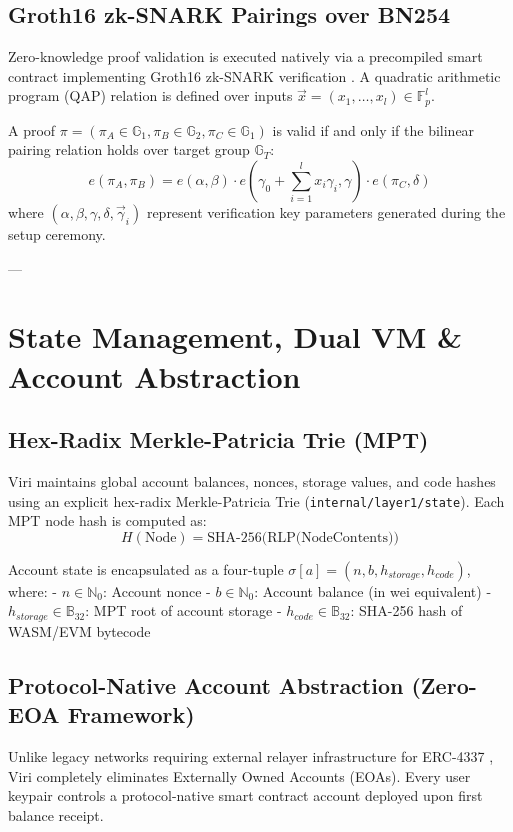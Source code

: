 \documentclass[10pt,journal,compsoc,twocolumn]{IEEEtran}
\begin{document}
\subsection{Groth16 zk-SNARK Pairings over BN254}
Zero-knowledge proof validation is executed natively via a precompiled smart contract implementing Groth16 zk-SNARK verification \cite{groth2016size}. A quadratic arithmetic program (QAP) relation is defined over inputs $\vec{x} = (x_1, \dots, x_l) \in \mathbb{F}_p^l$.

A proof $\pi = (\pi_A \in \mathbb{G}_1, \pi_B \in \mathbb{G}_2, \pi_C \in \mathbb{G}_1)$ is valid if and only if the bilinear pairing relation holds over target group $\mathbb{G}_T$:
\begin{equation}
e(\pi_A, \pi_B) = e(\alpha, \beta) \cdot e\left( \gamma_0 + \sum_{i=1}^l x_i \gamma_i, \gamma \right) \cdot e(\pi_C, \delta)
\label{eq:groth16}
\end{equation}
where $(\alpha, \beta, \gamma, \delta, \vec{\gamma}_i)$ represent verification key parameters generated during the setup ceremony.

---

\section{State Management, Dual VM \& Account Abstraction}
\label{sec:state_vm_aa}

\subsection{Hex-Radix Merkle-Patricia Trie (MPT)}
Viri maintains global account balances, nonces, storage values, and code hashes using an explicit hex-radix Merkle-Patricia Trie (\texttt{internal/layer1/state}). Each MPT node hash is computed as:
\begin{equation}
H(\text{Node}) = \text{SHA-256}\Big( \text{RLP}\big( \text{NodeContents} \big) \Big)
\end{equation}

Account state is encapsulated as a four-tuple $\sigma[a] = (n, b, h_{storage}, h_{code})$, where:
- $n \in \mathbb{N}_0$: Account nonce
- $b \in \mathbb{N}_0$: Account balance (in wei equivalent)
- $h_{storage} \in \mathbb{B}_{32}$: MPT root of account storage
- $h_{code} \in \mathbb{B}_{32}$: SHA-256 hash of WASM/EVM bytecode

\subsection{Protocol-Native Account Abstraction (Zero-EOA Framework)}
Unlike legacy networks requiring external relayer infrastructure for ERC-4337 \cite{erc4337}, Viri completely eliminates Externally Owned Accounts (EOAs). Every user keypair controls a protocol-native smart contract account deployed upon first balance receipt.
\end{document}
